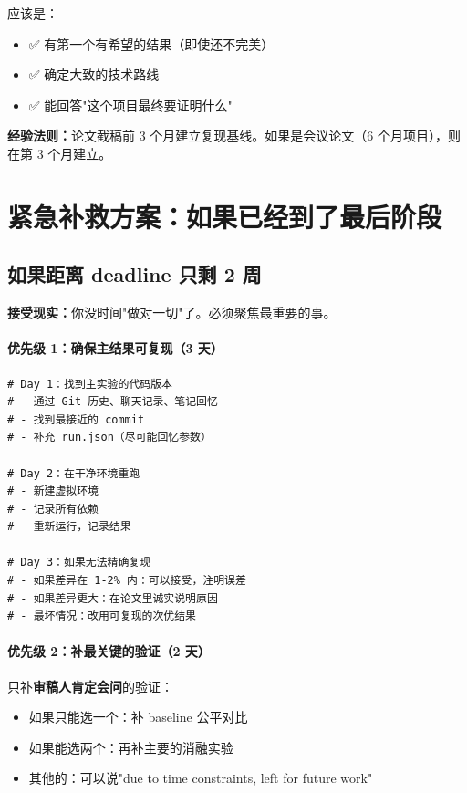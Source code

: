 应该是：
\begin{itemize}
  \item ✅ 有第一个有希望的结果（即使还不完美）
  \item ✅ 确定大致的技术路线
  \item ✅ 能回答"这个项目最终要证明什么"
\end{itemize}

\textbf{经验法则：}论文截稿前 3 个月建立复现基线。如果是会议论文（6 个月项目），则在第 3 个月建立。

\section{紧急补救方案：如果已经到了最后阶段}

\subsection{如果距离 deadline 只剩 2 周}

\textbf{接受现实：}你没时间"做对一切"了。必须聚焦最重要的事。

\paragraph{优先级 1：确保主结果可复现（3 天）}

\begin{verbatim}
# Day 1：找到主实验的代码版本
# - 通过 Git 历史、聊天记录、笔记回忆
# - 找到最接近的 commit
# - 补充 run.json（尽可能回忆参数）

# Day 2：在干净环境重跑
# - 新建虚拟环境
# - 记录所有依赖
# - 重新运行，记录结果

# Day 3：如果无法精确复现
# - 如果差异在 1-2% 内：可以接受，注明误差
# - 如果差异更大：在论文里诚实说明原因
# - 最坏情况：改用可复现的次优结果
\end{verbatim}

\paragraph{优先级 2：补最关键的验证（2 天）}

只补\textbf{审稿人肯定会问}的验证：
\begin{itemize}
  \item 如果只能选一个：补 baseline 公平对比
  \item 如果能选两个：再补主要的消融实验
  \item 其他的：可以说"due to time constraints, left for future work"
\end{itemize}

